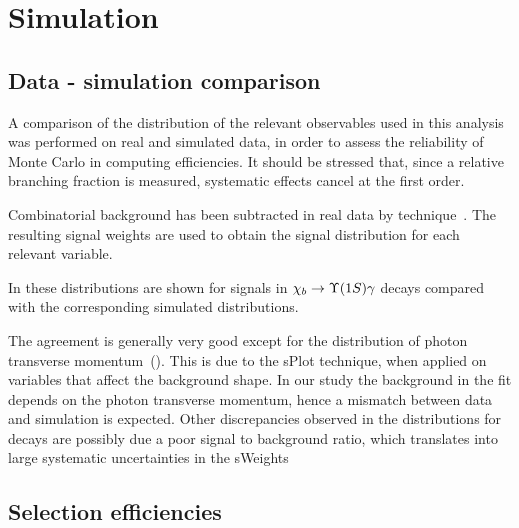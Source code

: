 
\section{Simulation}
\label{sec:mc}

\subsection{Data - simulation comparison}
\label{sec:mc:datavsmc}

A comparison of the distribution of the relevant observables used in this
analysis was performed on real and simulated data, in order to assess the
reliability of Monte Carlo in computing efficiencies. It should be stressed
that, since a relative branching fraction is measured, systematic effects cancel
at the first order.

Combinatorial background has been subtracted in real data by 
\sPlot  technique~\cite{Pivk:2004ty}.
The resulting signal weights are used to obtain the signal distribution for each
relevant variable. 


In 
these distributions  are shown for signals in $\chib \to \Y1S \gamma$ decays
compared with the corresponding simulated distributions.




The agreement is generally very good except for the distribution of photon
transverse momentum~(). This is due to the sPlot
technique, when applied on variables that affect the background shape. In our
study the background in the fit depends on the photon transverse momentum,
hence a mismatch between data and simulation is expected. Other discrepancies
observed in the distributions for \chibThreeP decays are possibly due a poor
signal to background ratio, which translates into large systematic
uncertainties in the sWeights


\subsection{Selection efficiencies}
\label{sec:mc:eff}

